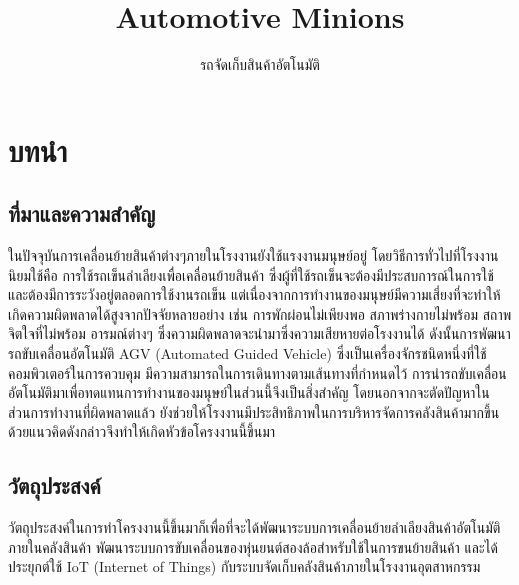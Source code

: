 \documentclass{classes/fiboreport}
\begin{document}
\subject{ENE495 Internet of Things}
\title{Automotive Minions}
\subtitle{รถจัดเก็บสินค้าอัตโนมัติ}
\pagecolor{tudelft-orange}
\maketitle

% 
\tableofcontents
\listoffigures
% 
% 

\chapter{บทนำ}
\section{ที่มาและความสำคัญ}
ในปัจจุบันการเคลื่อนย้ายสินค้าต่างๆภายในโรงงานยังใช้แรงงานมนุษย์อยู่ โดยวิธีการทั่วไปที่โรงงานนิยมใช้คือ
การใช้รถเข็นลำเลียงเพื่อเคลื่อนย้ายสินค้า ซึ่งผู้ที่ใช้รถเข็นจะต้องมีประสบการณ์ในการใช้ และต้องมีการระวังอยู่ตลอดการใช้งานรถเข็น
แต่เนื่องจากการทำงานของมนุษย์มีความเสี่ยงที่จะทำให้เกิดความผิดพลาดได้สูงจากปัจจัยหลายอย่าง เช่น
การพักผ่อนไม่เพียงพอ สภาพร่างกายไม่พร้อม สถาพจิตใจที่ไม่พร้อม อารมณ์ต่างๆ ซึ่งความผิดพลาดจะนำมาซึ่งความเสียหายต่อโรงงานได้
ดังนั้นการพัฒนารถขับเคลื่อนอัตโนมัติ AGV (Automated Guided Vehicle) ซึ่งเป็นเครื่องจักรชนิดหนึ่งที่ใช้คอมพิวเตอร์ในการควบคุม
มีความสามารถในการเดินทางตามเส้นทางที่กำหนดไว้ การนำรถขับเคลื่อนอัตโนมัติมาเพื่อทดแทนการทำงานของมนุษย์ในส่วนนี้จึงเป็นสิ่งสำคัญ
โดยนอกจากจะตัดปัญหาในส่วนการทำงานที่ผิดพลาดแล้ว ยังช่วยให้โรงงานมีประสิทธิภาพในการบริหารจัดการคลังสินค้ามากขึ้น
ด้วยแนวคิดดังกล่าวจึงทำให้เกิดหัวข้อโครงงานนี้ขึ้นมา

\section{วัตถุประสงค์}
วัตถุประสงค์ในการทำโครงงานนี้ขึ้นมาก็เพื่อที่จะได้พัฒนาระบบการเคลื่อนย้ายลำเลียงสินค้าอัตโนมัติภายในคลังสินค้า
พัฒนาระบบการขับเคลื่อนของหุ่นยนต์สองล้อสำหรับใช้ในการขนย้ายสินค้า และได้ประยุกต์ใช้ IoT (Internet of Things)
กับระบบจัดเก็บคลังสินค้าภายในโรงงานอุตสาหกรรม
\end{document}
